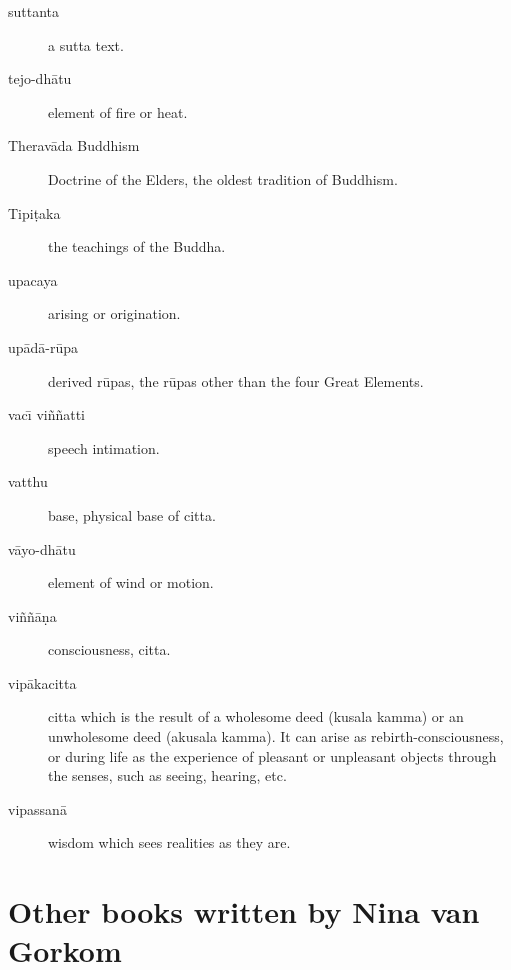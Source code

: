 \documentclass{book}
\begin{document}
\begin{description}
\item[suttanta] a sutta text.
\item[tejo-dh\=atu] element of fire or heat.
\item[Therav\=ada Buddhism] Doctrine of the Elders, the oldest tradition of Buddhism.
\item[Tipi\d taka] the teachings of the Buddha.
\item[upacaya] arising or origination.
\item[up\=ad\=a-r\=upa] derived r\=upas, the r\=upas other than the four Great Elements.
\item[vac\=\i{} vi\~n\~natti ]speech intimation.
\item[vatthu] base, physical base of citta.
\item[v\=ayo-dh\=atu] element of wind or motion.
\item[vi\~n\~n\=a\d na] consciousness, citta.
\item[vip\=akacitta] citta which is the result of a wholesome deed (kusala kamma) or an unwholesome deed (akusala kamma). It can arise as rebirth-consciousness, or during life as the experience of pleasant or unpleasant objects through the senses, such as seeing, hearing, etc.
\item[vipassan\=a] wisdom which sees realities as they are.
\end{description}



\vspace{10 mm}
\section*{Other books written by Nina van Gorkom}
\end{document}

